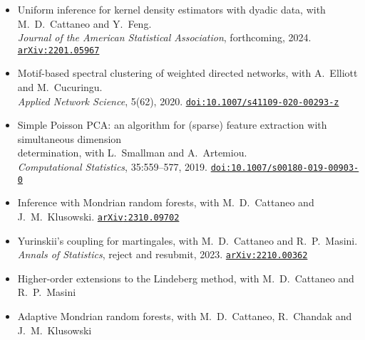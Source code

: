 \documentclass[
  date,
  number,
]{wgu-cv}
\begin{document}
\begin{itemize}

  \item Uniform inference for kernel density estimators with dyadic data,
    with M.\ D.\ Cattaneo and Y.\ Feng. \\
    \emph{Journal of the American Statistical Association}, forthcoming,
    2024.
    \href{https://arxiv.org/abs/2201.05967}{%
    \texttt{arXiv{:}{\allowbreak}2201.05967}}%

  \item Motif-based spectral clustering of weighted directed networks,
    with A.\ Elliott and M.\ Cucuringu. \\
    \emph{Applied Network Science}, 5(62), 2020.
    \href{https://doi.org/10.1007/s41109-020-00293-z}{%
    \texttt{doi:10.1007/s41109-020-00293-z}}%

  \item Simple Poisson PCA: an algorithm for (sparse) feature extraction
    with simultaneous dimension \\ determination,
    with L.\ Smallman and A.\ Artemiou. \\
    \emph{Computational Statistics}, 35:559--577, 2019.
    \href{https://doi.org/10.1007/s00180-019-00903-0}{%
    \texttt{doi:10.1007/s00180-019-00903-0}}%

\end{itemize}

\begin{itemize}

  \item Inference with Mondrian random forests,
    with M.\ D.\ Cattaneo and J.\ M.\ Klusowski.
    \href{https://arxiv.org/abs/2310.09702}{%
    \texttt{arXiv{:}{\allowbreak}2310.09702}}%

  \item Yurinskii's coupling for martingales,
    with M.\ D.\ Cattaneo and R.\ P.\ Masini. \\
    \emph{Annals of Statistics}, reject and resubmit, 2023.
    \href{https://arxiv.org/abs/2210.00362}{%
    \texttt{arXiv{:}{\allowbreak}2210.00362}}%

\end{itemize}

\begin{itemize}

  \item Higher-order extensions to the Lindeberg method,
    with M.\ D.\ Cattaneo and R.\ P.\ Masini

  \item Adaptive Mondrian random forests,
    with M.\ D.\ Cattaneo, R.\ Chandak and J.\ M.\ Klusowski
\end{itemize}
\end{document}
